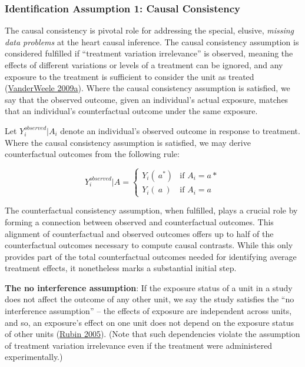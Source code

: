 \documentclass[
  singlecolumn]{article}
\begin{document}
\hypertarget{identification-assumption-1-causal-consistency}{%
\subsubsection{Identification Assumption 1: Causal
Consistency}\label{identification-assumption-1-causal-consistency}}

The causal consistency is pivotal role for addressing the special,
elusive, \emph{missing data problems} at the heart causal inference. The
causal consistency assumption is considered fulfilled if ``treatment
variation irrelevance'' is observed, meaning the effects of different
variations or levels of a treatment can be ignored, and any exposure to
the treatment is sufficient to consider the unit as treated
(\protect\hyperlink{ref-vanderweele2009}{VanderWeele 2009a}). Where the
causal consistency assumption is satisfied, we say that the observed
outcome, given an individual's actual exposure, matches that an
individual's counterfactual outcome under the same exposure.

Let \(Y_i^{observed}|A_i\) denote an individual's observed outcome in
response to treatment. Where the causal consistency assumption is
satisfied, we may derive counterfactual outcomes from the following
rule:

\[
Y_i^{observed}|A = 
\begin{cases} 
Y_i(~a^*) & \text{if } A_i = a* \\
Y_i(~a~) & \text{if } A_i = a
\end{cases}
\]

The counterfactual consistency assumption, when fulfilled, plays a
crucial role by forming a connection between observed and counterfactual
outcomes. This alignment of counterfactual and observed outcomes offers
up to half of the counterfactual outcomes necessary to compute causal
contrasts. While this only provides part of the total counterfactual
outcomes needed for identifying average treatment effects, it
nonetheless marks a substantial initial step.

\textbf{The no interference assumption}: If the exposure status of a
unit in a study does not affect the outcome of any other unit, we say
the study satisfies the ``no interference assumption'' -- the effects of
exposure are independent across units, and so, an exposure's effect on
one unit does not depend on the exposure status of other units
(\protect\hyperlink{ref-rubin2005}{Rubin 2005}). (Note that such
dependencies violate the assumption of treatment variation irrelevance
even if the treatment were administered experimentally.)
\end{document}
